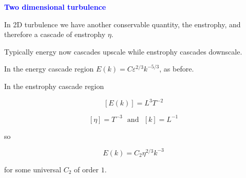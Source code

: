 \documentclass[a4]{seminar}
\newcommand{\B}[1]{\textcolor{blue}{#1}}
\begin{document}

\begin{slide}

\B{\bf Two dimensional turbulence}

\vspace{2mm}

In 2D turbulence we have another conservable quantity, the enstrophy,
and therefore a cascade of enstrophy \( \eta \).

Typically energy now cascades upscale while enstrophy cascades
downscale.

\begin{center}
\end{center}

\end{slide}


\begin{slide}

In the energy cascade region \( E(k) = C \varepsilon^{2/3} k ^{-5/3} \),
as before.

\vspace{2mm}

In the enstrophy cascade region

\begin{displaymath}
\left[ E(k) \right] = L^3 T^{-2}
\end{displaymath}

\begin{displaymath}
\left[ \eta \right] = T^{-3} \ \ \ \mathrm{and} \ \ \ 
\left[ k \right] = L^{-1}
\end{displaymath}

so

\begin{displaymath}
E(k) = C_2 \eta^{2/3} k^{-3}
\end{displaymath}

for some universal \( C_2 \) of order \( 1 \).


\end{slide}

\end{document}
